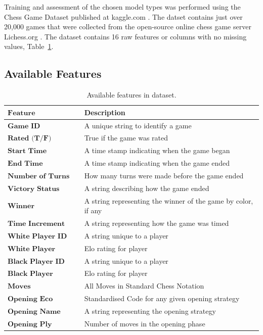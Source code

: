 \documentclass[12pt]{article}
\begin{document}
Training and assessment of the chosen model types was performed using the Chess Game Dataset published at kaggle.com \cite{chessDataset}. The datset contains just over 20,000 games that were collected from the open-source online chess game server Lichess.org \cite{lichessOrg}. The dataset contains 16 raw features or columns with no missing values, Table~\ref{tab:features}.

\subsection{Available Features}

\begin{table}[h!]
\centering
\begin{tabular}{|l|l|}
\hline
$\textbf{Feature}$ & Description \\ \hline
$\textbf{Game ID}$ & A unique string to identify a game \\ \hline
$\textbf{Rated (T/F)}$ & True if the game was rated \\ \hline
$\textbf{Start Time}$ & A time stamp indicating when the game began \\ \hline
$\textbf{End Time}$ & A time stamp indicating when the game ended \\ \hline
$\textbf{Number of Turns}$ & How many turns were made before the game ended \\ \hline
$\textbf{Victory Status}$ & A string describing how the game ended \\ \hline
$\textbf{Winner}$ & A string representing the winner of the game by color, if any \\ \hline
$\textbf{Time Increment}$ & A string representing how the game was timed \\ \hline
$\textbf{White Player ID}$ & A string unique to a player \\ \hline
$\textbf{White Player Rating}$ & Elo rating for player \\ \hline
$\textbf{Black Player ID}$ & A string unique to a player \\ \hline
$\textbf{Black Player Rating}$ & Elo rating for player \\ \hline
$\textbf{Moves}$ & All Moves in Standard Chess Notation \\ \hline
$\textbf{Opening Eco}$ & Standardised Code for any given opening strategy \\ \hline
$\textbf{Opening Name}$ & A string representing the opening strategy \\ \hline
$\textbf{Opening Ply}$ & Number of moves in the opening phase \\ \hline
\end{tabular}
\caption{Available features in dataset.}
\label{tab:features}
\end{table}
\end{document}
